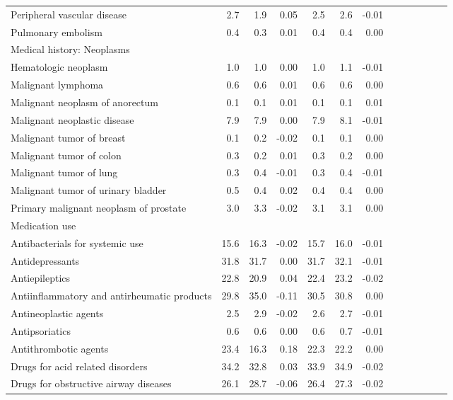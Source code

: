 \documentclass[11pt,]{article}
\begin{document}
\begin{longtable}{lrrrrrrrrrrrr}
      Peripheral vascular disease &  2.7 &  1.9 &  0.05 &  2.5 &  2.6 & -0.01 \\ 
      Pulmonary embolism &  0.4 &  0.3 &  0.01 &  0.4 &  0.4 &  0.00 \\ 
  Medical history: Neoplasms &    &    &     &    &    &     \\ 
      Hematologic neoplasm &  1.0 &  1.0 &  0.00 &  1.0 &  1.1 & -0.01 \\ 
      Malignant lymphoma &  0.6 &  0.6 &  0.01 &  0.6 &  0.6 &  0.00 \\ 
      Malignant neoplasm of anorectum &  0.1 &  0.1 &  0.01 &  0.1 &  0.1 &  0.01 \\ 
      Malignant neoplastic disease &  7.9 &  7.9 &  0.00 &  7.9 &  8.1 & -0.01 \\ 
      Malignant tumor of breast &  0.1 &  0.2 & -0.02 &  0.1 &  0.1 &  0.00 \\ 
      Malignant tumor of colon &  0.3 &  0.2 &  0.01 &  0.3 &  0.2 &  0.00 \\ 
      Malignant tumor of lung &  0.3 &  0.4 & -0.01 &  0.3 &  0.4 & -0.01 \\ 
      Malignant tumor of urinary bladder &  0.5 &  0.4 &  0.02 &  0.4 &  0.4 &  0.00 \\ 
      Primary malignant neoplasm of prostate &  3.0 &  3.3 & -0.02 &  3.1 &  3.1 &  0.00 \\ 
  Medication use &    &    &     &    &    &     \\ 
      Antibacterials for systemic use & 15.6 & 16.3 & -0.02 & 15.7 & 16.0 & -0.01 \\ 
      Antidepressants & 31.8 & 31.7 &  0.00 & 31.7 & 32.1 & -0.01 \\ 
      Antiepileptics & 22.8 & 20.9 &  0.04 & 22.4 & 23.2 & -0.02 \\ 
      Antiinflammatory and antirheumatic products & 29.8 & 35.0 & -0.11 & 30.5 & 30.8 &  0.00 \\ 
      Antineoplastic agents &  2.5 &  2.9 & -0.02 &  2.6 &  2.7 & -0.01 \\ 
      Antipsoriatics &  0.6 &  0.6 &  0.00 &  0.6 &  0.7 & -0.01 \\ 
      Antithrombotic agents & 23.4 & 16.3 &  0.18 & 22.3 & 22.2 &  0.00 \\ 
      Drugs for acid related disorders & 34.2 & 32.8 &  0.03 & 33.9 & 34.9 & -0.02 \\ 
      Drugs for obstructive airway diseases & 26.1 & 28.7 & -0.06 & 26.4 & 27.3 & -0.02 \\ 

\end{longtable}
\end{document}
